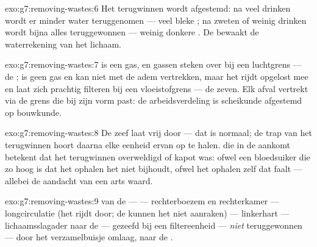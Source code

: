\begin{solution}{exo:g7:removing-wastes:6}
Het terugwinnen wordt afgestemd: na veel drinken wordt er minder water
teruggenomen --- veel bleke ; na zweten of weinig drinken wordt bijna
alles teruggewonnen --- weinig donkere . De  bewaakt de
waterrekening van het lichaam.
\end{solution}

\begin{solution}{exo:g7:removing-wastes:7}
 is een gas, en gassen steken over bij een luchtgrens ---
de ;  is geen gas en kan niet met de adem vertrekken,
maar het rijdt opgelost mee en laat zich prachtig filteren bij een
vloeistofgrens --- de zeven. Elk afval vertrekt via de grens die bij zijn
vorm past: de arbeidsverdeling is scheikunde afgestemd op bouwkunde.
\end{solution}

\begin{solution}{exo:g7:removing-wastes:8}
De zeef laat  vrij door --- dat is normaal; de trap van het
terugwinnen hoort daarna elke eenheid ervan op te halen.  die in de
 aankomt betekent dat het terugwinnen overweldigd of kapot was:
ofwel een bloedsuiker die zo hoog is dat het ophalen het niet bijhoudt,
ofwel het ophalen zelf dat faalt --- allebei de aandacht van een arts
waard.
\end{solution}

\begin{solution}{exo:g7:removing-wastes:9}
 van de  ---  --- rechterboezem en rechterkamer ---
longcirculatie (het  rijdt door; de  kunnen het niet aanraken)
--- linkerhart --- lichaamsslagader naar de  --- gezeefd bij een
filtereenheid --- \emph{niet} teruggewonnen --- door het verzamelbuisje
omlaag, naar de .
\end{solution}

